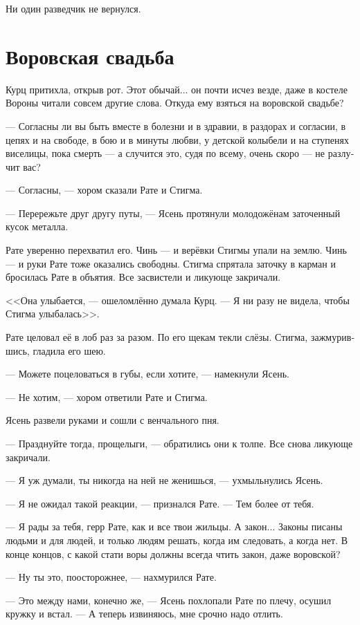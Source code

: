 \documentclass[a4paper,12pt,fleqn]{book}\usepackage{cooltooltips}\usepackage{polyglossia}\setdefaultlanguage[babelshorthands=true]{russian}\setotherlanguage{english}\defaultfontfeatures{Ligatures=TeX,Mapping=tex-text} \usepackage{xcolor}\definecolor{lightgray}{HTML}{bbbbbb}\color{lightgray}\newcommand{\ml}[3]{\textenglish{\textcolor{black}{#3}}}
\newcommand{\asterism}{\vspace{1em}{\centering\Large\bfseries$\ast~\ast~\ast$\par}\vspace{1em}}
\begin{document}
Ни один разведчик не вернулся.

\section{Воровская свадьба}

Курц притихла, открыв рот.
Этот обычай... он почти исчез везде, даже в костеле Вороны читали совсем другие слова.
Откуда ему взяться на воровской свадьбе?

--- Согласны ли вы быть вместе в болезни и в здравии, в раздорах и согласии, в цепях и на свободе, в бою и в минуты любви, у детской колыбели и на ступенях виселицы, пока смерть --- а случится это, судя по всему, очень скоро --- не разлучит вас?

--- Согласны, --- хором сказали Рате и Стигма.

--- Перережьте друг другу путы, --- Ясень протянули молодожёнам заточенный кусок металла.

Рате уверенно перехватил его.
Чинь --- и верёвки Стигмы упали на землю.
Чинь --- и руки Рате тоже оказались свободны.
Стигма спрятала заточку в карман и бросилась Рате в объятия.
Все засвистели и ликующе закричали.

<<Она улыбается, --- ошеломлённо думала Курц.
--- Я ни разу не видела, чтобы Стигма улыбалась>>.

Рате целовал её в лоб раз за разом.
По его щекам текли слёзы.
Стигма, зажмурившись, гладила его шею.

--- Можете поцеловаться в губы, если хотите, --- намекнули Ясень.

--- Не хотим, --- хором ответили Рате и Стигма.

Ясень развели руками и сошли с венчального пня.

--- Празднуйте тогда, прощелыги, --- обратились они к толпе.
Все снова ликующе закричали.

\asterism

--- Я уж думали, ты никогда на ней не женишься, --- ухмыльнулись Ясень.

--- Я не ожидал такой реакции, --- признался Рате.
--- Тем более от тебя.

--- Я рады за тебя, герр Рате, как и все твои жильцы.
А закон...
Законы писаны людьми и для людей, и только людям решать, когда им следовать, а когда нет.
В конце концов, с какой стати воры должны всегда чтить закон, даже воровской?

--- Ну ты это, поосторожнее, --- нахмурился Рате.

--- Это между нами, конечно же, --- Ясень похлопали Рате по плечу, осушил кружку и встал.
--- А теперь извиняюсь, мне срочно надо отлить.
\end{document}
